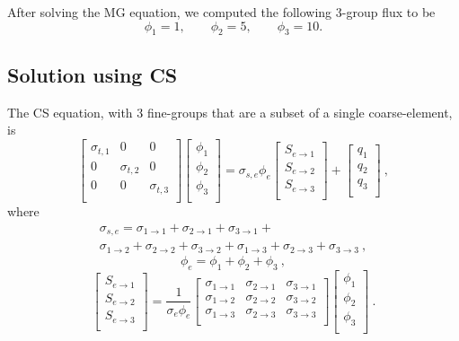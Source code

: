 \documentclass{anstrans}
\begin{document}
After solving the MG equation, we computed the following 3-group flux to be
\begin{equation*}
\phi_1 = 1, \quad\quad \phi_2 = 5, \quad\quad \phi_3 = 10.
\end{equation*}
\subsection{Solution using CS}
The CS equation, with 3 fine-groups that are a subset of a single coarse-element, is
\begin{equation*}
\begin{bmatrix}
\sigma_{t,1} & 0 & 0\\
0  & \sigma_{t,2} & 0\\
0 & 0 & \sigma_{t,3}\\
\end{bmatrix}
\begin{bmatrix}
\phi_1\\
\phi_2\\
\phi_3\\
\end{bmatrix}
=
\sigma_{s,e} \phi_e
\begin{bmatrix}
S_{e \to 1}\\
S_{e \to 2}\\
S_{e \to 3}\\
\end{bmatrix}
+
\begin{bmatrix}
q_1\\
q_2\\
q_3\\
\end{bmatrix} \: ,
\end{equation*}
where 
\begin{multline*}
\sigma_{s,e} = \sigma_{1 \to 1} + \sigma_{2 \to 1} + \sigma_{3 \to 1} + \\ \sigma_{1 \to 2} + \sigma_{2 \to 2} + \sigma_{3 \to 2} + \sigma_{1 \to 3} + \sigma_{2 \to 3} + \sigma_{3 \to 3} \: , 
\end{multline*}
\begin{equation*}
\phi_e = \phi_1 + \phi_2 + \phi_3 \: ,
\end{equation*}
\begin{equation*}
\begin{bmatrix}
S_{e \to 1}\\
S_{e \to 2}\\
S_{e \to 3}\\
\end{bmatrix} 
=
\frac{1}{\sigma_e \phi_e}
\begin{bmatrix}
\sigma_{1 \to 1} & \sigma_{2 \to 1} & \sigma_{3 \to 1}\\
\sigma_{1 \to 2} & \sigma_{2 \to 2} & \sigma_{3 \to 2}\\
\sigma_{1 \to 3} & \sigma_{2 \to 3} & \sigma_{3 \to 3}\\
\end{bmatrix}
\begin{bmatrix}
\phi_1\\
\phi_2\\
\phi_3\\ 
\end{bmatrix} \: .
\end{equation*}
\end{document}
